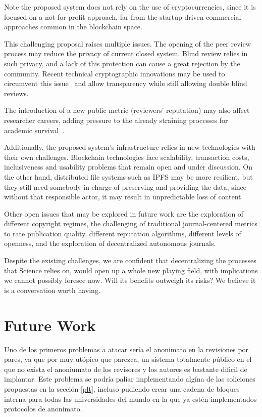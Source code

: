 Note the proposed system does not rely on the use of cryptocurrencies, since it
is focused on a not-for-profit approach, far from the startup-driven commercial
approaches common in the blockchain space.

This challenging proposal raises multiple issues. The opening of the peer review
process may reduce the privacy of current closed system. Blind review relies in
such privacy, and a lack of this protection can cause a great rejection by the
community. Recent technical cryptographic innovations may be used to circumvent
this issue~\cite{blum1988non} and allow transparency while still allowing double
blind reviews.

The introduction of a new public metric (reviewers' reputation) may also affect
researcher careers, adding pressure to the already straining processes for
academic survival~\cite{de2005publish}.

Additionally, the proposed system's infrastructure relies in new technologies
with their own challenges. Blockchain technologies face scalability, transaction
costs, inclusiveness and usability problems that remain open and under
discussion. On the other hand, distributed file systems such as IPFS may be more
resilient, but they still need somebody in charge of preserving and providing
the data, since without that responsible actor, it may result in unpredictable
loss of content.

Other open issues that may be explored in future work are the exploration of
different copyright regimes, the challenging of traditional journal-centered
metrics to rate publication quality, different reputation algorithms, different
levels of openness, and the exploration of decentralized autonomous journals.

Despite the existing challenges, we are confident that decentralizing the
processes that Science relies on, would open up a whole new playing field, with
implications we cannot possibly foresee now. Will its benefits outweigh its
risks? We believe it is a conversation worth having.

\section{Future Work}

Uno de los primeros problemas a atacar sería el anonimato en la revisiones por
pares, ya que por muy utópico que parezca, un sistema totalmente público en el
que no exista el anoniumato de los revisores y los autores es bastante dificil
de implantar. Este problema se podría paliar implementando algína de las
soliciones propuestas en la sección \ref{plt}, incluso pudiendo crear una cadena
de bloques interna para todas las universidades del mundo en la que ya estén
implementados protocolos de anonimato.

